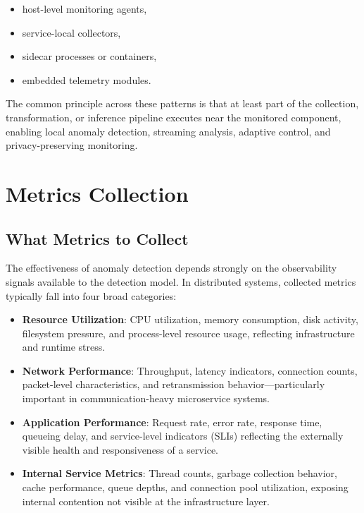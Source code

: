 \begin{itemize}
    \item host-level monitoring agents,
    \item service-local collectors,
    \item sidecar processes or containers,
    \item embedded telemetry modules.
\end{itemize}

The common principle across these patterns is that at least part of the collection,
transformation, or inference pipeline executes near the monitored component, enabling
local anomaly detection, streaming analysis, adaptive control, and privacy-preserving
monitoring.

\section{Metrics Collection}
\label{sec:metrics_collection}

\subsection{What Metrics to Collect}
\label{subsec:metrics_what}

The effectiveness of anomaly detection depends strongly on the observability signals
available to the detection model. In distributed systems, collected metrics typically
fall into four broad categories:

\begin{itemize}
    \item \textbf{Resource Utilization}: CPU utilization, memory consumption, disk
    activity, filesystem pressure, and process-level resource usage, reflecting
    infrastructure and runtime stress.

    \item \textbf{Network Performance}: Throughput, latency indicators, connection
    counts, packet-level characteristics, and retransmission behavior---particularly
    important in communication-heavy microservice systems.

    \item \textbf{Application Performance}: Request rate, error rate, response time,
    queueing delay, and service-level indicators (SLIs) reflecting the externally
    visible health and responsiveness of a service.

    \item \textbf{Internal Service Metrics}: Thread counts, garbage collection
    behavior, cache performance, queue depths, and connection pool utilization,
    exposing internal contention not visible at the infrastructure layer.
\end{itemize}

